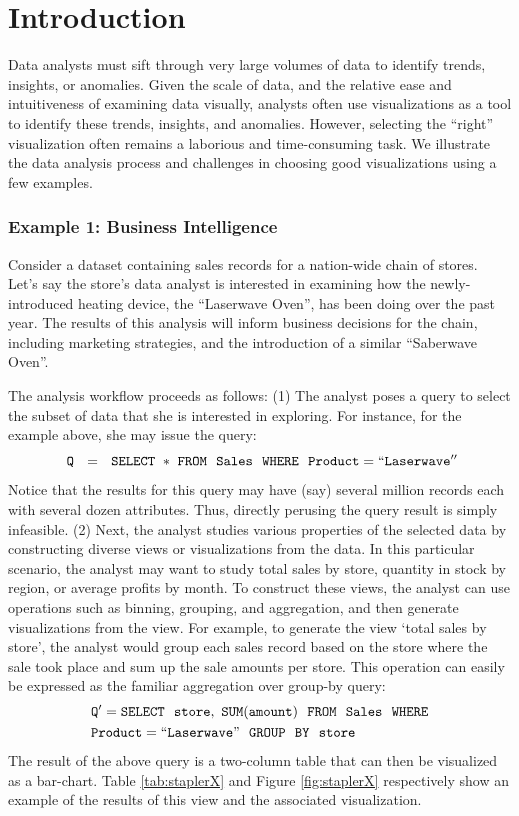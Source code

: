 
\section{Introduction}
\label{sec:introduction}


Data analysts must sift through very large volumes of data 
to identify trends, insights, or anomalies. 
Given the scale of data, and the relative ease and 
intuitiveness of examining data visually,
analysts often use visualizations as a tool to identify
these trends, insights, and anomalies.
However, selecting the ``right'' visualization often 
remains a laborious and time-consuming task. 
We illustrate the data analysis
process and challenges in choosing good visualizations using a few examples.




\subsubsection*{Example 1: Business Intelligence}
Consider a dataset containing sales records for a nation-wide
chain of stores.
Let's say the store's data analyst is interested
in examining how the newly-introduced heating device, the ``Laserwave
Oven'', has been doing over the past year.
The results of this analysis will inform business decisions
for the chain, including marketing strategies, and the introduction of a similar
``Saberwave Oven''.

The analysis workflow proceeds as follows:
(1) The analyst poses a query to select the subset of data that she is
interested in exploring.
For instance, for the example above, she may issue the query:
\noindent $${\tt \ Q \ \ = \ \ SELECT \ * \ FROM \ \  Sales \ \ WHERE \ \
Product=``Laserwave''} $$ \noindent Notice that the results for this query may
have (say) several million records each with several dozen attributes.
Thus, directly perusing the query result is simply infeasible.
(2) Next, the analyst studies various properties of the selected data by
constructing diverse views or visualizations from the data. In this particular
scenario, the analyst may want to study total sales by store, quantity in stock
by region, or average profits by month. To construct these views, the analyst
can use operations such as binning, grouping, and aggregation, and then generate
visualizations from the view. For example, to generate the view `total sales by
store', the analyst would group each sales record based on the store where the
sale took place and sum up the sale amounts per store. This operation can easily
be expressed as the familiar aggregation over group-by query:
\noindent
\begin{align*}
& \tt Q' = SELECT \ \ store,\ SUM(amount) \ \ FROM \ \  Sales \ \ WHERE \\
& \tt Product=``Laserwave" \ \ GROUP  \ \ BY \ \ store
\end{align*}
The result of the above query is a two-column table that can then be visualized
as a bar-chart. Table \ref{tab:staplerX} and Figure
\ref{fig:staplerX} respectively show an example of the results of this view and
the associated visualization.



